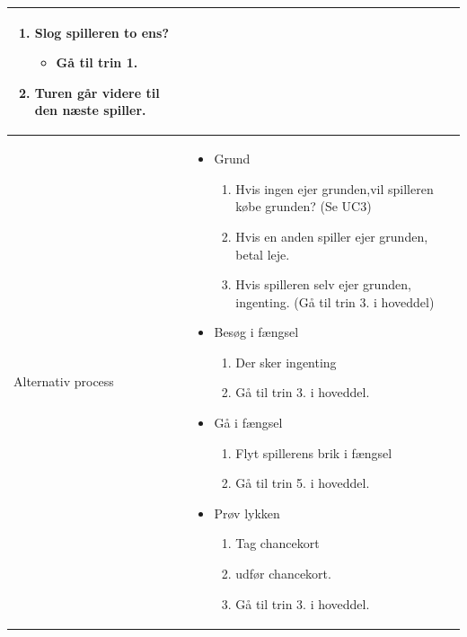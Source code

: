 \begin{center}
\begin{longtable}{|l|p{11cm}|}
\begin{minipage}[t]{1\textwidth}
\begin{enumerate}
\begin{itemize}
          \item Modtag 4000. 
      \end{itemize}
      \item Slog spilleren to ens?
      \begin{itemize}
          \item Gå til trin 1.
      \end{itemize}
      \item Turen går videre til den næste spiller.\vspace{0.5cm}
  \end{enumerate} 
  \end{minipage}
\\
\hline
Alternativ process & 
\begin{minipage}[t]{1\textwidth}
 \begin{itemize}
     \item Grund
     \begin{enumerate}
         \item Hvis ingen ejer grunden,\newline vil spilleren købe grunden? (Se UC3)
         \item Hvis en anden spiller ejer grunden, betal leje.
         \item Hvis spilleren selv ejer grunden, ingenting. \newline (Gå til trin 3. i hoveddel)
     \end{enumerate}
     \item Besøg i fængsel
     \begin{enumerate}
         \item Der sker ingenting
         \item Gå til trin 3. i hoveddel.
     \end{enumerate}
     \item Gå i fængsel
     \begin{enumerate}
         \item Flyt spillerens brik i fængsel
         \item Gå til trin 5. i hoveddel.
     \end{enumerate}
     \item Prøv lykken
     \begin{enumerate}
         \item Tag chancekort 
         \item udfør chancekort.
         \item Gå til trin 3. i hoveddel.
     \end{enumerate}

\end{itemize}
\end{minipage}
\end{longtable}
\end{center}
